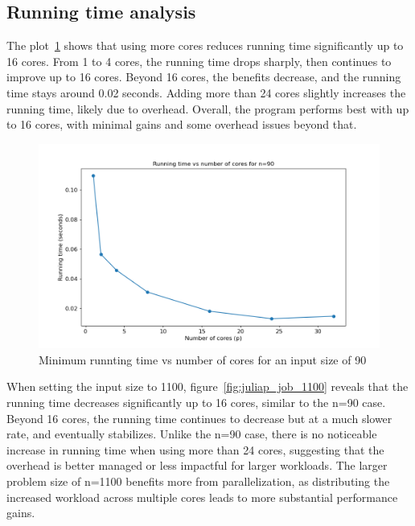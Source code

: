 \documentclass[a4paper,%
7pt,%
DIV12,
headsepline,%
headings=normal,
]{scrartcl}
\begin{document}
\subsection{Running time analysis}

The plot~\ref{fig:juliap_job_90} shows that using more cores reduces running time significantly up to 16 cores. From 1 to 4 cores, the running time drops sharply, then continues to improve up to 16 cores. Beyond 16 cores, the benefits decrease, and the running time stays around 0.02 seconds. Adding more than 24 cores slightly increases the running time, likely due to overhead. Overall, the program performs best with up to 16 cores, with minimal gains and some overhead issues beyond that.

\begin{figure}[htbp]
    \centering
    \includegraphics[width=1\linewidth]{./juliap_job_90.png}
    \caption{Minimum runnting time vs number of cores for an input size of 90}
    \label{fig:juliap_job_90}
\end{figure}

\newpage
When setting the input size to 1100, figure~\ref{fig:juliap_job_1100} reveals that the running time decreases significantly up to 16 cores, similar to the n=90 case. Beyond 16 cores, the running time continues to decrease but at a much slower rate, and eventually stabilizes. Unlike the n=90 case, there is no noticeable increase in running time when using more than 24 cores, suggesting that the overhead is better managed or less impactful for larger workloads. The larger problem size of n=1100 benefits more from parallelization, as distributing the increased workload across multiple cores leads to more substantial performance gains.
\end{document}
